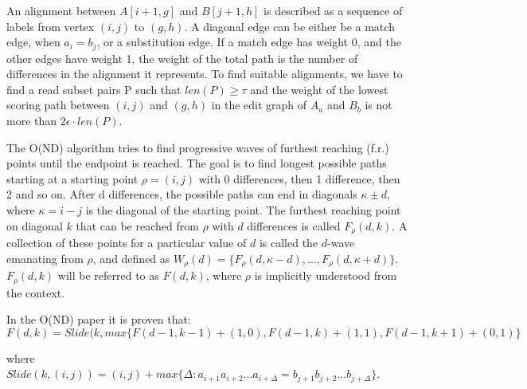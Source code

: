 \documentclass[../main/thesis.tex]{subfiles}
\begin{document}
An alignment between $A[i+1,g]$ and $B[j+1,h]$ is described as a sequence of labels from vertex $(i,j)$ to $(g,h)$.
A diagonal edge can be either be a match edge, when $a_i = b_j$, or a substitution edge.
If a match edge has weight 0, and the other edges have weight 1, the weight of the total path is the number of differences in the alignment it represents.
To find suitable alignments, we have to find a read subset pairs P such that $len(P)\ge \tau$ and the weight of the lowest scoring path between $(i,j)$ and $(g,h)$ in the edit graph of $A_a$ and $B_b$ is not more than $2\epsilon\cdot len(P)$.


The O(ND) algorithm tries to find progressive waves of furthest reaching (f.r.) points until the endpoint is reached.
The goal is to find longest possible paths starting at a starting point $\rho = (i,j)$ with 0 differences, then 1 difference, then 2 and so on.
After d differences, the possible paths can end in diagonals $\kappa \pm d$, where $\kappa = i-j$ is the diagonal of the starting point.
The furthest reaching point on diagonal $k$ that can be reached from $\rho$ with $d$ differences is called $F_\rho(d,k)$.
A collection of these points for a particular value of $d$ is called the $d$-wave emanating from $\rho$, and defined as $W_\rho(d) = \{F_\rho(d,\kappa-d),...,F_\rho(d,\kappa+d)\}$.
$F_\rho(d,k)$ will be referred to as $F(d,k)$, where $\rho$ is implicitly understood from the context.

In the O(ND) paper it is proven that:
\begin{equation}
F(d,k)=Slide(k, max\{F(d-1,k-1)+(1,0), F(d-1,k)+(1,1), F(d-1,k+1)+(0,1)\}
\end{equation}

where $Slide(k,(i,j)) = (i,j) + max\{\Delta:a_{i+1}a_{i+2}...a_{i+\Delta} = b_{j+1}b_{j+2}...b_{j+\Delta}\}$.
\end{document}
